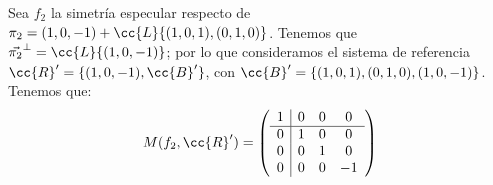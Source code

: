\begin{ejercicio}
\begin{enumerate}
        Sea $f_2$ la simetría especular respecto de $\pi_2=(1,0,-1) + \cc{L}\{(1,0,1), (0,1,0)\}$. Tenemos que $\vec{\pi_2}^\perp = \cc{L}\{(1,0,-1)\}$; por lo que consideramos el sistema de referencia $\cc{R}'=\{(1,0,-1), \cc{B}'\}$, con $\cc{B}'=\{(1,0,1), (0,1,0), (1,0,-1)\}$. Tenemos que:
        \begin{equation*}
            M(f_2,\cc{R}') = \left(
            \begin{array}{c|ccc}
                1 & 0 & 0 & 0 \\ \hline
                0 & 1 & 0 & 0 \\
                0 & 0 & 1 & 0 \\
                0 & 0 & 0 & -1
            \end{array}
            \right)
        \end{equation*}


\end{enumerate}
\end{ejercicio}
